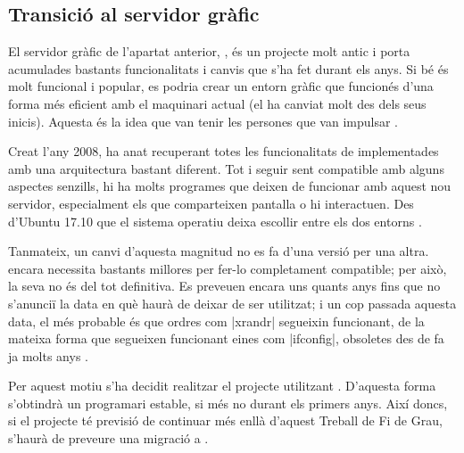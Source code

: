 
\subsection{Transició al servidor gràfic }
\label{subsec:wayland}

El servidor gràfic de l'apartat anterior, , és un projecte molt antic
i porta acumulades bastants funcionalitats i canvis que s'ha fet durant els
anys. Si bé és molt funcional i popular, es podria crear un entorn gràfic que
funcionés d'una forma més eficient amb el maquinari actual (el 
ha canviat molt des dels seus inicis). Aquesta és la idea que van tenir les
persones que van impulsar .

Creat l'any 2008, ha anat recuperant totes les funcionalitats de 
implementades amb una arquitectura bastant diferent. Tot i seguir sent
compatible amb alguns aspectes senzills, hi ha molts programes que deixen de
funcionar amb aquest nou servidor, especialment els que comparteixen pantalla
o hi interactuen. Des d'Ubuntu 17.10 que el sistema operatiu deixa
escollir entre els dos entorns \cite{Wayland}.

Tanmateix, un canvi d'aquesta magnitud no es fa d'una versió per una altra.
 encara necessita bastants millores per fer-lo completament
compatible; per això, la seva  no és del tot definitiva. Es preveuen
encara uns quants anys fins que no s'anunciï la data en què  haurà de
deixar de ser utilitzat; i un cop passada aquesta data, el més probable és que
ordres com \ord|xrandr| segueixin funcionant, de la mateixa forma que segueixen
funcionant eines com \ord|ifconfig|, obsoletes des de fa ja molts anys
\cite{Ifconfig}.

Per aquest motiu s'ha decidit realitzar el projecte utilitzant .
D'aquesta forma s'obtindrà un programari estable, si més no durant els primers
anys. Així doncs, si el projecte té previsió de continuar més enllà d'aquest
Treball de Fi de Grau, s'haurà de preveure una migració a .
